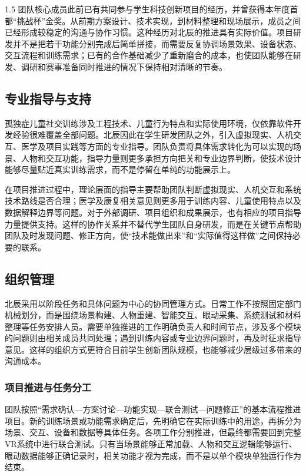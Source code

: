 \documentclass[zihao=-4]{ctexart}
\begin{document}
\begin{spacing}{1.5}
团队核心成员此前已有共同参与学生科技创新项目的经历，并曾获得本年度首都“挑战杯”金奖。从前期方案设计、技术实现，到材料整理和现场展示，成员之间已经形成较稳定的沟通与协作习惯。这种经历对北辰的推进具有实际价值。项目研发并不是把若干功能分别完成后简单拼接，而需要反复协调场景效果、设备状态、交互流程和训练需求；已有的合作基础减少了重新磨合的成本，也使团队能够在研发、调研和赛事准备同时推进的情况下保持相对清晰的节奏。

\subsection{专业指导与支持}

孤独症儿童社交训练涉及工程技术、儿童行为特点和实际使用环境，仅依靠软件开发经验很难覆盖全部问题。北辰因此在学生研发团队之外，引入虚拟现实、人机交互、医学及项目实践等方面的专业指导。团队负责将具体需求转化为可以实现的场景、人物和交互功能，指导力量则更多承担方向把关和专业边界判断，使技术设计能够尽量贴近真实训练需求，而不是停留在单纯的功能展示上。

在项目推进过程中，理论层面的指导主要帮助团队判断虚拟现实、人机交互和系统技术路线是否合理；医学及康复相关意见则更多用于训练内容、儿童使用特点以及数据解释边界等问题。对于外部调研、项目组织和成果展示，也有相应的项目指导力量提供支持。这样的协作关系并不替代学生团队自身研发，而是在关键节点帮助团队及时发现问题、修正方向，使“技术能做出来”和“实际值得这样做”之间保持必要的联系。

\subsection{组织管理}

北辰采用以阶段任务和具体问题为中心的协同管理方式。日常工作不按照固定部门机械划分，而是围绕场景构建、人物重建、智能交互、眼动采集、系统测试和材料整理等任务安排人员。需要单独推进的工作明确负责人和时间节点，涉及多个模块的问题则由相关成员共同处理；遇到训练内容或专业边界问题时，再及时征求指导意见。这样的组织方式更符合目前学生创新团队规模，也能够减少层级过多带来的沟通成本。

\subsubsection{项目推进与任务分工}

团队按照“需求确认—方案讨论—功能实现—联合测试—问题修正”的基本流程推进项目。新的训练场景或功能需求确定后，先明确它在实际训练中的用途，再拆分为场景、交互、设备和数据等具体任务。各项工作分别推进，但最终都需要回到完整VR系统中进行联合测试。只有当场景能够正常加载、人物和交互逻辑能够运行、眼动数据能够正确记录时，相关功能才视为完成，而不是以单个模块单独运行作为结束。


\end{spacing}
\end{document}

